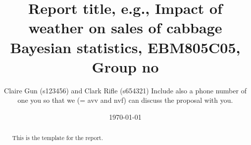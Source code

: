 \documentclass[a4paper,11pt]{article}
\author{Claire Gun (s123456) and Clark Rifle (s654321) Include also a phone number of one you so that we (= avv and nvf) can discuss the proposal with you.}
\date{\today}
\title{Report title, e.g., Impact of weather on sales of cabbage\\
  Bayesian statistics, EBM805C05,  Group no}
\theoremstyle{definition}
\numberwithin{equation}{section}
\newcommand{\1}[1]{\,I_{#1}} %
\begin{document}
\maketitle

\begin{abstract}
  This is the template for the report.
\end{abstract}








\appendix



\end{document}
